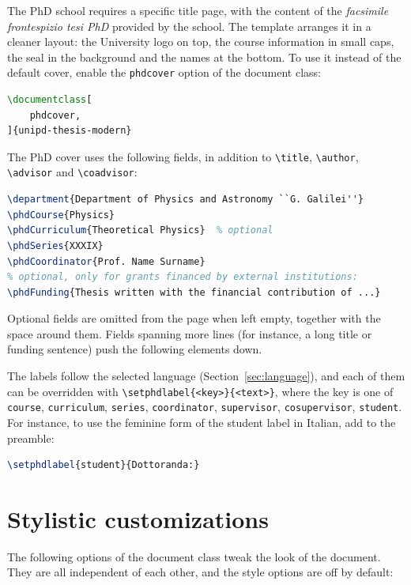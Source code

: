 The PhD school requires a specific title page, with the content of the \emph{facsimile frontespizio tesi PhD} provided by the school.
The template arranges it in a cleaner layout: the University logo on top, the course information in small caps, the seal in the background and the names at the bottom.
To use it instead of the default cover, enable the \texttt{phdcover} option of the document class:

\begin{lstlisting}[language=TeX]
\documentclass[
    phdcover,
]{unipd-thesis-modern}
\end{lstlisting}

The PhD cover uses the following fields, in addition to \verb|\title|, \verb|\author|, \verb|\advisor| and \verb|\coadvisor|:

\begin{lstlisting}[language=TeX]
\department{Department of Physics and Astronomy ``G. Galilei''}
\phdCourse{Physics}
\phdCurriculum{Theoretical Physics}  % optional
\phdSeries{XXXIX}
\phdCoordinator{Prof. Name Surname}
% optional, only for grants financed by external institutions:
\phdFunding{Thesis written with the financial contribution of ...}
\end{lstlisting}

Optional fields are omitted from the page when left empty, together with the space around them.
Fields spanning more lines (for instance, a long title or funding sentence) push the following elements down.

The labels follow the selected language (Section~\ref{sec:language}), and each of them can be overridden with \verb|\setphdlabel{<key>}{<text>}|, where the key is one of \texttt{course}, \texttt{curriculum}, \texttt{series}, \texttt{coordinator}, \texttt{supervisor}, \texttt{cosupervisor}, \texttt{student}.
For instance, to use the feminine form of the student label in Italian, add to the preamble:
\begin{lstlisting}[language=TeX]
\setphdlabel{student}{Dottoranda:}
\end{lstlisting}



\section{Stylistic customizations}\label{sec:custom}

The following options of the document class tweak the look of the document.
They are all independent of each other, and the style options are off by default:

